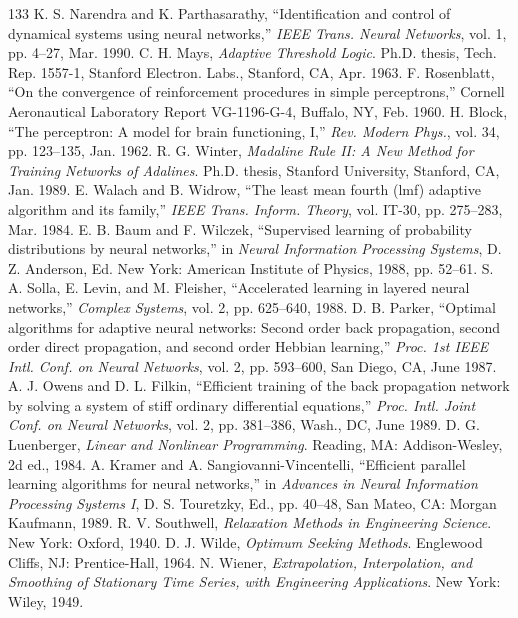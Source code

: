 \documentclass[10pt,twocolumn]{article}
\begin{document}
\begin{thebibliography}{133}
 K. S. Narendra and K. Parthasarathy, ``Identification and control of dynamical systems using neural networks,'' \textit{IEEE Trans. Neural Networks}, vol. 1, pp. 4--27, Mar. 1990.
 C. H. Mays, \textit{Adaptive Threshold Logic}. Ph.D. thesis, Tech. Rep. 1557-1, Stanford Electron. Labs., Stanford, CA, Apr. 1963.
 F. Rosenblatt, ``On the convergence of reinforcement procedures in simple perceptrons,'' Cornell Aeronautical Laboratory Report VG-1196-G-4, Buffalo, NY, Feb. 1960.
 H. Block, ``The perceptron: A model for brain functioning, I,'' \textit{Rev. Modern Phys.}, vol. 34, pp. 123--135, Jan. 1962.
 R. G. Winter, \textit{Madaline Rule II: A New Method for Training Networks of Adalines}. Ph.D. thesis, Stanford University, Stanford, CA, Jan. 1989.
 E. Walach and B. Widrow, ``The least mean fourth (lmf) adaptive algorithm and its family,'' \textit{IEEE Trans. Inform. Theory}, vol. IT-30, pp. 275--283, Mar. 1984.
 E. B. Baum and F. Wilczek, ``Supervised learning of probability distributions by neural networks,'' in \textit{Neural Information Processing Systems}, D. Z. Anderson, Ed. New York: American Institute of Physics, 1988, pp. 52--61.
 S. A. Solla, E. Levin, and M. Fleisher, ``Accelerated learning in layered neural networks,'' \textit{Complex Systems}, vol. 2, pp. 625--640, 1988.
 D. B. Parker, ``Optimal algorithms for adaptive neural networks: Second order back propagation, second order direct propagation, and second order Hebbian learning,'' \textit{Proc. 1st IEEE Intl. Conf. on Neural Networks}, vol. 2, pp. 593--600, San Diego, CA, June 1987.
 A. J. Owens and D. L. Filkin, ``Efficient training of the back propagation network by solving a system of stiff ordinary differential equations,'' \textit{Proc. Intl. Joint Conf. on Neural Networks}, vol. 2, pp. 381--386, Wash., DC, June 1989.
 D. G. Luenberger, \textit{Linear and Nonlinear Programming}. Reading, MA: Addison-Wesley, 2d ed., 1984.
 A. Kramer and A. Sangiovanni-Vincentelli, ``Efficient parallel learning algorithms for neural networks,'' in \textit{Advances in Neural Information Processing Systems I}, D. S. Touretzky, Ed., pp. 40--48, San Mateo, CA: Morgan Kaufmann, 1989.
 R. V. Southwell, \textit{Relaxation Methods in Engineering Science}. New York: Oxford, 1940.
 D. J. Wilde, \textit{Optimum Seeking Methods}. Englewood Cliffs, NJ: Prentice-Hall, 1964.
 N. Wiener, \textit{Extrapolation, Interpolation, and Smoothing of Stationary Time Series, with Engineering Applications}. New York: Wiley, 1949.

\end{thebibliography}
\end{document}
